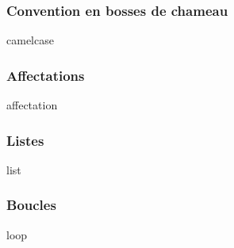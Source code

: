\subsubsection{Convention en bosses de chameau}

{camelcase}




\subsubsection{Affectations}

{affectation}




\subsubsection{Listes}

{list}




\subsubsection{Boucles}

{loop}
